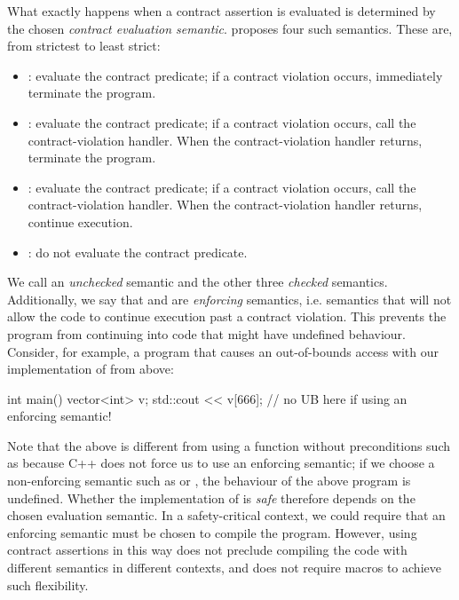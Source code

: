 What exactly happens when a contract assertion is evaluated is determined by the chosen \emph{contract evaluation semantic}. \cite{P2900R7} proposes four such semantics. These are, from strictest to least strict:
\begin{itemize}
\item {}: evaluate the contract predicate; if a contract violation occurs, immediately terminate the program.
\item {}: evaluate the contract predicate; if a contract violation occurs, call the contract-violation handler. When the contract-violation handler returns, terminate the program.
\item {}: evaluate the contract predicate; if a contract violation occurs, call the contract-violation handler. When the contract-violation handler returns, continue execution.
\item {}: do not evaluate the contract predicate.
\end{itemize}

We call  an \emph{unchecked} semantic and the other three \emph{checked} semantics. Additionally, we say that \mbox{} and  are \emph{enforcing} semantics, i.e. semantics that will not allow the code to continue execution past a contract violation. This prevents the program from continuing into code that might have undefined behaviour. Consider, for example, a program that causes an out-of-bounds access with our implementation of  from above:
\begin{codeblock}
int main() {
  vector<int> v;
  std::cout << v[666];    // no UB here if using an enforcing semantic!
}
\end{codeblock}
Note that the above is different from using a function without preconditions such as \mbox{} because C++ does not force us to use an enforcing semantic; if we choose a non-enforcing semantic such as  or , the behaviour of the above program is undefined. Whether the implementation of   is \emph{safe} therefore depends on the chosen evaluation semantic. In a safety-critical context, we could require that an enforcing semantic must be chosen to compile the program. However, using contract assertions in this way does not preclude compiling the code with different semantics in different contexts, and does not require macros to achieve such flexibility.

